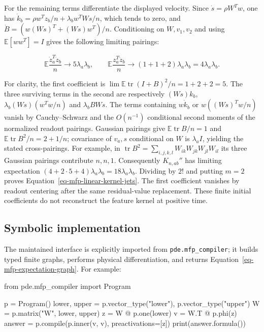 \documentclass[
  11pt,
]{article}
\newenvironment{Shaded}{\begin{snugshade}}{\end{snugshade}}
\newcommand{\BuiltInTok}[1]{\textcolor[rgb]{0.00,0.23,0.31}{#1}}
\newcommand{\ImportTok}[1]{\textcolor[rgb]{0.00,0.46,0.62}{#1}}
\newcommand{\NormalTok}[1]{\textcolor[rgb]{0.00,0.23,0.31}{#1}}
\newcommand{\OperatorTok}[1]{\textcolor[rgb]{0.37,0.37,0.37}{#1}}
\newcommand{\StringTok}[1]{\textcolor[rgb]{0.13,0.47,0.30}{#1}}
\theoremstyle{definition}
\theoremstyle{plain}
\theoremstyle{plain}
\theoremstyle{plain}
\theoremstyle{remark}
\begin{document}
For the remaining terms differentiate the displayed velocity. Since
\(\dot s=\rho W^Tw\), one has
\(\dot k_b=\rho w^Tz_b/n+\lambda_b w^TWs/n\), which tends to zero, and
\(\dot B=(w(Ws)^T+(Ws)w^T)/n\). Conditioning on \(W,v_1,v_2\) and using
\(\mathbb E[ww^T]=I\) gives the following limiting pairings:

\[
\mathbb E\frac{\dot z_a^T\dot z_b}{n}\longrightarrow
5\lambda_a\lambda_b,\qquad
\mathbb E\frac{z_a^T\ddot z_b}{n}\longrightarrow
(1+1+2)\lambda_a\lambda_b=4\lambda_a\lambda_b.
\]

For clarity, the first coefficient is
\(\lim\mathbb E\operatorname{tr}(I+B)^2/n=1+2+2=5\). The three surviving
terms in the second are respectively \((Ws)k_b\),
\(\lambda_b(Ws)(w^Tw/n)\) and \(\lambda_bBWs\). The terms containing
\(w\dot k_b\) or \(w((Ws)^Tw/n)\) vanish by Cauchy--Schwarz and the
\(O(n^{-1})\) conditional second moments of the normalized readout
pairings. Gaussian pairings give \(\mathbb E\operatorname{tr}B/n=1\) and
\(\mathbb E\operatorname{tr}B^2/n=2+1/n\); covariance of \(v_a,s\)
conditional on \(W\) is \(\lambda_a I\), yielding the stated
cross-pairings. For example, in \(\operatorname{tr}B^2=
\sum_{i,j,k,l}W_{ik}W_{jk}W_{jl}W_{il}\) its three Gaussian pairings
contribute \(n,n,1\). Consequently \(K_{n,ab}''\) has limiting
expectation \((4+2\cdot5+4)\lambda_a\lambda_b=18\lambda_a\lambda_b\).
Dividing by \(2!\) and putting \(m=2\) proves
Equation~\ref{eq-mfp-linear-kernel-jets}. The first coefficient vanishes
by readout centering after the same residual-value replacement. These
finite initial coefficients do not reconstruct the feature kernel at
positive time.

\subsection{Symbolic implementation}\label{sec-mfp-symbolic-interface}

The maintained interface is explicitly imported from
\texttt{pde.mfp\_compiler}; it builds typed finite graphs, performs
physical differentiation, and returns
Equation~\ref{eq-mfp-expectation-graph}. For example:

\begin{Shaded}
\begin{Highlighting}[]
\ImportTok{from}\NormalTok{ pde.mfp\_compiler }\ImportTok{import}\NormalTok{ Program}

\NormalTok{p }\OperatorTok{=}\NormalTok{ Program()}
\NormalTok{lower, upper }\OperatorTok{=}\NormalTok{ p.vector\_type(}\StringTok{"lower"}\NormalTok{), p.vector\_type(}\StringTok{"upper"}\NormalTok{)}
\NormalTok{W }\OperatorTok{=}\NormalTok{ p.matrix(}\StringTok{"W"}\NormalTok{, lower, upper)}
\NormalTok{z }\OperatorTok{=}\NormalTok{ W }\OperatorTok{@}\NormalTok{ p.one(lower)}
\NormalTok{v }\OperatorTok{=}\NormalTok{ W.T }\OperatorTok{@}\NormalTok{ p.phi(z)}
\NormalTok{answer }\OperatorTok{=}\NormalTok{ p.}\BuiltInTok{compile}\NormalTok{(p.inner(v, v), preactivations}\OperatorTok{=}\NormalTok{[z])}
\BuiltInTok{print}\NormalTok{(answer.formula())}
\end{Highlighting}
\end{Shaded}
\end{document}
